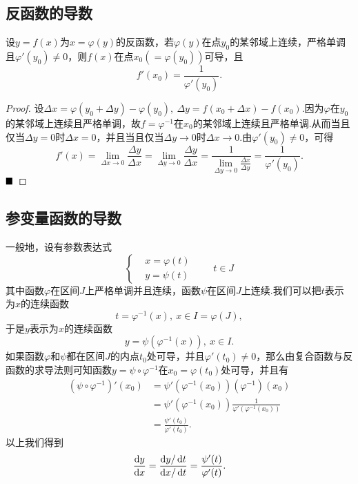 \subsection{反函数的导数}
\begin{theorem}
	设$y=f(x)$为$x=\varphi(y)$的反函数，若$\varphi(y)$在点$y_0$的某邻域上连续，严格单调且$\varphi'(y_0)\neq 0$，则$f(x)$在点$x_0(=\varphi(y_0))$可导，且
	$$f'(x_0)=\frac{1}{\varphi'(y_0)}.$$
\end{theorem}
\begin{proof}
	设$\Delta x=\varphi(y_0+\Delta y)-\varphi(y_0),\ \Delta y=f(x_0+\Delta x)-f(x_0)$.因为$\varphi$在$y_0$的某邻域上连续且严格单调，故$f=\varphi^{-1}$在$x_0$的某邻域上连续且严格单调.从而当且仅当$\Delta y=0$时$\Delta x=0$，并且当且仅当$\Delta y\to 0$时$\Delta x\to 0$.由$\varphi'(y_0)\neq 0$，可得
	$$f'(x)=\lim\limits_{\Delta x\to 0}\frac{\Delta y}{\Delta x}=\lim\limits_{\Delta y\to 0}\frac{\Delta y}{\Delta x}=\frac{1}{\lim\limits_{\Delta y\to 0}\frac{\Delta x}{\Delta y}}=\frac{1}{\varphi'(y_0)}.$$
	$\hfill\blacksquare$
\end{proof}
\subsection{参变量函数的导数}
一般地，设有参数表达式
\begin{equation*}
	\left\{
	\begin{aligned}
		&x=\varphi(t)\\
		&y=\psi(t)
	\end{aligned}
	\qquad t\in J
	\right.
\end{equation*}
其中函数$\varphi$在区间$J$上严格单调并且连续，函数$\psi$在区间$J$上连续.我们可以把$t$表示为$x$的连续函数
$$t=\varphi^{-1}(x),\ x\in I=\varphi(J),$$
于是$y$表示为$x$的连续函数
$$y=\psi(\varphi^{-1}(x)),\ x\in I.$$
如果函数$\varphi$和$\psi$都在区间$J$的内点$t_0$处可导，并且$\varphi'(t_0)\neq 0$，那么由复合函数与反函数的求导法则可知函数$y=\psi\circ\varphi^{-1}$在$x_0=\varphi(t_0)$处可导，并且有
\begin{align*}
	(\psi\circ\varphi^{-1})'(x_0)&=\psi'(\varphi^{-1}(x_0))(\varphi^{-1})(x_0)\\
	&=\psi'(\varphi^{-1}(x_0))\frac{1}{\varphi'(\varphi^{-1}(x_0))}\\
	&=\frac{\psi'(t_0)}{\varphi'(t_0)}.
\end{align*}
以上我们得到
$$\frac{\odif{y}}{\odif{x}}=\frac{\odif{y}/\odif{t}}{\odif{x}/\odif{t}}=\frac{\psi'(t)}{\varphi'(t)}.$$

